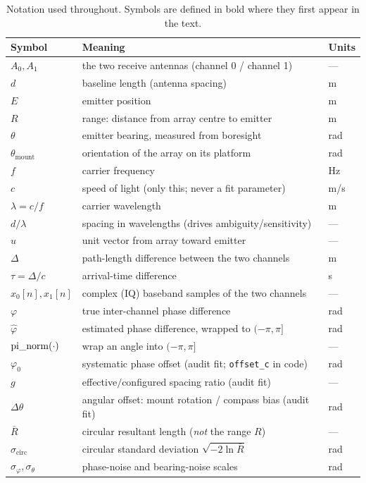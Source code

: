 \begin{table}[ht]
\centering
\caption{Notation used throughout. Symbols are defined in bold where they
first appear in the text.}
\label{tab:notation}
\begin{tabular}{lll}
\toprule
Symbol & Meaning & Units \\
\midrule
$A_0, A_1$ & the two receive antennas (channel 0 / channel 1) & --- \\
$d$ & baseline length (antenna spacing) & m \\
$E$ & emitter position & m \\
$R$ & range: distance from array centre to emitter & m \\
$\theta$ & emitter bearing, measured from boresight & rad \\
$\theta_{\mathrm{mount}}$ & orientation of the array on its platform & rad \\
$f$ & carrier frequency & Hz \\
$c$ & speed of light (only this; never a fit parameter) & m/s \\
$\lambda = c/f$ & carrier wavelength & m \\
$d/\lambda$ & spacing in wavelengths (drives ambiguity/sensitivity) & --- \\
$\hat u$ & unit vector from array toward emitter & --- \\
$\Delta$ & path-length difference between the two channels & m \\
$\tau = \Delta/c$ & arrival-time difference & s \\
$x_0[n], x_1[n]$ & complex (IQ) baseband samples of the two channels & --- \\
$\varphi$ & true inter-channel phase difference & rad \\
$\hat\varphi$ & estimated phase difference, wrapped to $(-\pi,\pi]$ & rad \\
$\operatorname{pi\_norm}(\cdot)$ & wrap an angle into $(-\pi, \pi]$ & --- \\
$\varphi_0$ & systematic phase offset (audit fit; \texttt{offset\_c} in code) & rad \\
$g$ & effective$/$configured spacing ratio (audit fit) & --- \\
$\Delta\theta$ & angular offset: mount rotation / compass bias (audit fit) & rad \\
$\bar R$ & circular resultant length (\emph{not} the range $R$) & --- \\
$\sigma_{\mathrm{circ}}$ & circular standard deviation $\sqrt{-2\ln\bar R}$ & rad \\
$\sigma_\varphi, \sigma_\theta$ & phase-noise and bearing-noise scales & rad \\
\bottomrule
\end{tabular}
\end{table}

